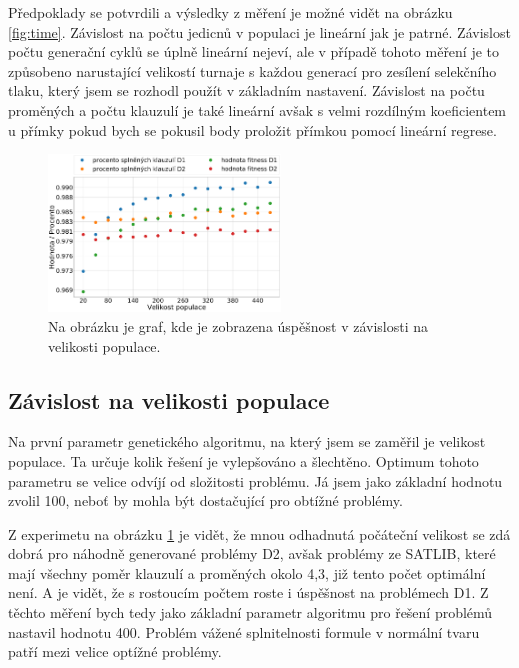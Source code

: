 \documentclass[11pt]{article}
\begin{document}
Předpoklady se potvrdili a výsledky z měření je možné vidět na obrázku \ref{fig:time}. Závislost na počtu jedicnů v populaci je lineární jak je patrné. Závislost počtu generační cyklů se úplně lineární nejeví, ale v případě tohoto měření je to způsobeno narustající velikostí turnaje s každou generací pro zesílení selekčního tlaku, který jsem se rozhodl použít v základním nastavení. Závislost na počtu proměných a počtu klauzulí je také lineární avšak s velmi rozdílným koeficientem u přímky pokud bych se pokusil body proložit přímkou pomocí lineární regrese.


\begin{figure}
\begin{center}
\includegraphics[width=0.55\textwidth]{img/sat_gen_size.pdf} 
\caption{Na obrázku je graf, kde je zobrazena úspěšnost v závislosti na velikosti populace.}
\label{fig:genSize}
\end{center}
\end{figure}

\subsection{Závislost na velikosti populace}
Na první parametr genetického algoritmu, na který jsem se zaměřil je velikost populace. Ta určuje kolik řešení je vylepšováno a šlechtěno. Optimum tohoto parametru se velice odvíjí od složitosti problému. Já jsem jako základní hodnotu zvolil 100, neboť by mohla být dostačující pro obtížné problémy.

Z experimetu na obrázku \ref{fig:genSize} je vidět, že mnou odhadnutá počáteční velikost se zdá dobrá pro náhodně generované problémy D2, avšak problémy ze SATLIB, které mají všechny poměr klauzulí a proměných okolo 4,3, již tento počet optimální není. A je vidět, že s rostoucím počtem roste i úspěšnost na problémech D1. Z těchto měření bych tedy jako základní parametr algoritmu pro řešení problémů nastavil hodnotu 400. Problém vážené splnitelnosti formule v normální tvaru patří mezi velice optížné problémy.
\end{document}
